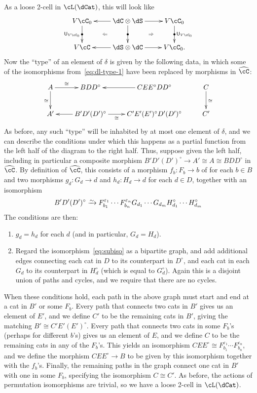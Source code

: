 \documentclass{amsart}
\let\ocomp\otimes
\newcommand{\C}{\cC}
\renewcommand{\Chat}{\ensuremath{\widehat{\C}}\xspace}
\newcommand{\hunit}[1]{\mathsf{U}_{#1}}
\newcommand{\dl}{\delta}
\renewcommand{\o}{^{\circ}}
\newcommand{\e}[1][]{^{\varepsilon_{#1}}}
\begin{document}
As a loose 2-cell in $\cL(\dCat)$, this will look like
\[ \xymatrix{ V\C_0 \ar[d]|{\bullet}_{\hunit {V\C_0}} \ar@{}[dr]|{\Leftarrow} &
  \dC\ocomp \dS \ar[l] \ar[d]|{\bullet} \ar[r] \ar@{}[dr]|{\Rightarrow} &
  V\C_0 \ar[d]|{\bullet}^{\hunit {V\C_0}}\\
  V\C & \dS\ocomp\dC \ar[l] \ar[r] & V\C_0. } \]
Now the ``type'' of an element of $\dl$ is given by the following data, in which some of the isomorphisms from~\eqref{eq:dl-type-1} have been replaced by morphisms in $\Chat$:
\[ \xymatrix{ A \ar[d]_\cong \ar[r]^-\cong & B D D\o & C E E\o D D\o \ar[l] & C \ar[d]^\cong \\
   A' & B' D' (D')\o \ar[l] \ar[r]_-\cong & C' E' (E')\o D' (D')\o & C' }\]
As before, any such ``type'' will be inhabited by at most one element of $\dl$, and we can describe the conditions under which this happens as a partial function from the left half of the diagram to the right half.
Thus, suppose given the left half, including in particular a composite morphism $B' D' (D')\o \to A'\cong A \cong B D D\o$ in $\Chat$.
By definition of $\Chat$, this consists of a morphism $f_b:F_b \to b$ of \C for each $b\in B$ and two morphisms $g_d:G_d\to d$ and $h_d:H_d \to d$ for each $d\in D$, together with an isomorphism
\begin{equation}\label{eq:subiso}
  B' D' (D')\o \toiso F_{b_1}\e[1]\cdots F_{b_n}\e[n] G_{d_1}\cdots G_{d_m} H_{d_1}\o \cdots H_{d_m}\o
\end{equation}
The conditions are then:
\begin{enumerate}
\item $g_d = h_d$ for each $d$ (and in particular, $G_d = H_d$).
\item Regard the isomorphism~\eqref{eq:subiso} as a bipartite graph, and add additional edges connecting each cat in $D$ to its counterpart in $D\o$, and each cat in each $G_d$ to its counterpart in $H_d\o$ (which is equal to $G_d\o$).
  Again this is a disjoint union of paths and cycles, and we require that there are no cycles.
\end{enumerate}
When these conditions hold, each path in the above graph must start and end at a cat in $B'$ or some $F_b$.
Every path that connects two cats in $B'$ gives us an element of $E'$, and we define $C'$ to be the remaining cats in $B'$, giving the matching $B' \cong C' E' (E')\o$.
Every path that connects two cats in some $F_b$'s (perhaps for different $b$'s) gives us an element of $E$, and we define $C$ to be the remaining cats in any of the $F_b$'s.
This yields an isomorphism $C E E\o \cong F_{b_1}\e[1]\cdots F_{b_n}\e[n]$, and we define the morphism $C E E\o \to B$ to be given by this isomorphism together with the $f_b$'s.
Finally, the remaining paths in the graph connect one cat in $B'$ with one in some $F_b$, specifying the isomorphism $C\cong C'$.
As before, the actions of permutation isomorphisms are trivial, so we have a loose 2-cell in $\cL(\dCat)$.
\end{document}
